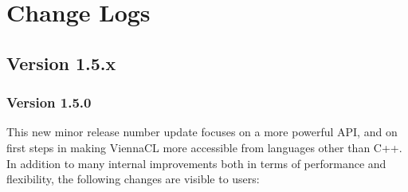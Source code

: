 
\chapter{Change Logs} %

\section*{Version 1.5.x}

\subsection*{Version 1.5.0}
This new minor release number update focuses on a more powerful API, and on first steps in making ViennaCL more accessible from languages other than C++.
In addition to many internal improvements both in terms of performance and flexibility, the following changes are visible to users:
